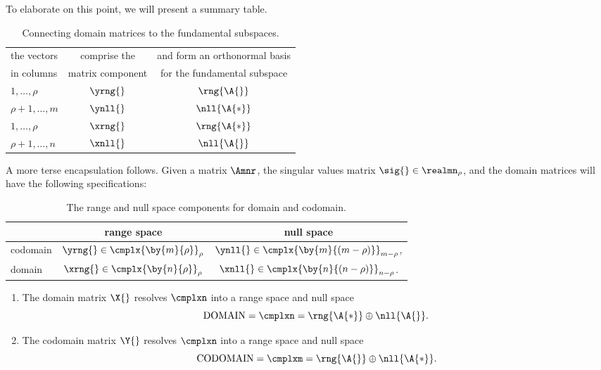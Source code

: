 To elaborate on this point, we will present a summary table. 
\begin{table}[htdp]
\begin{center}
\begin{tabular}{lcc}
  the vectors & comprise the & and form an orthonormal basis \\
  in columns  & matrix component & for the fundamental subspace \\\hline
  $1, \dots, \rho$     & $\yrng{}$ & $\rng{\A{}}$ \\
  \rowcolor{ltgray}
  $\rho + 1, \dots, m$ & $\ynll{}$ & $\nll{\A{*}}$ \\
  $1, \dots, \rho$     & $\xrng{}$ & $\rng{\A{*}}$ \\
  \rowcolor{ltgray}
  $\rho + 1, \dots, n$ & $\xnll{}$ & $\nll{\A{}}$ \\
\end{tabular}
\end{center}
\label{default}
\caption[Connecting domain matrices to the fundamental subspaces]{Connecting domain matrices to the fundamental subspaces.}
\end{table}%
A more terse encapsulation follows. Given a matrix $\Amnr$, the singular values matrix $\sig{}\in\realmn_{\rho}$, and the domain matrices will have the following specifications:
\begin{table}[htdp]
\begin{center}
\begin{tabular}{l|cc}
   & range space & null space \\\hline
  codomain & $\yrng{}\in\cmplx{\by{m}{\rho}}_{\rho}$ & $\ynll{}\in\cmplx{\by{m}{(m-\rho)}}_{m-\rho}$, \\
  domain   & $\xrng{}\in\cmplx{\by{n}{\rho}}_{\rho}$ & $\xnll{}\in\cmplx{\by{n}{(n-\rho)}}_{n-\rho}$.
\end{tabular}
\end{center}
\label{tab:svd:spaces}
\caption[The range and null space components for domain and codomain.]{The range and null space components for domain and codomain.}
\end{table}%


\begin{enumerate}
\item The domain matrix $\X{}$ resolves $\cmplxn$ into a range space and null space
\begin{equation}
  \text{DOMAIN} = \cmplxn = \rng{\A{*}} \oplus \nll{\A{}}.
\end{equation}
\item The codomain matrix $\Y{}$ resolves $\cmplxn$ into a range space and null space
\begin{equation}
  \text{CODOMAIN} = \cmplxm = \rng{\A{}} \oplus \nll{\A{*}}.
\end{equation}
\end{enumerate}

